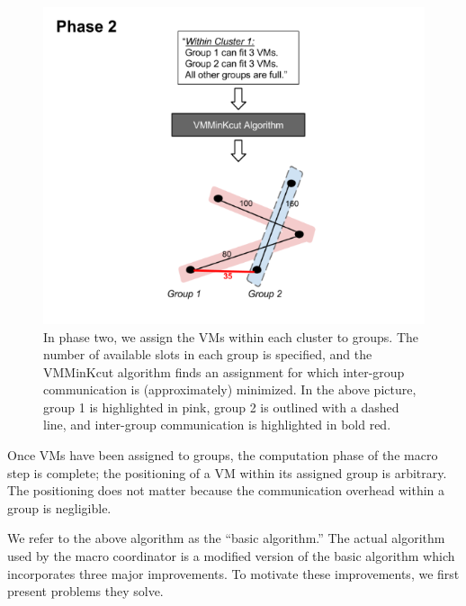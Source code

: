 \documentclass[11pt]{article}
\begin{document}
\begin{figure}
  \centering
\includegraphics[scale=0.7]{phase2.png}

 \caption{In phase two, we assign the VMs within each cluster to groups.  The number of available slots in each group is specified, and the VMMinKcut algorithm finds an assignment for which inter-group communication is (approximately) minimized.  In the above picture, group 1 is highlighted in pink, group 2 is outlined with a dashed line, and inter-group communication is highlighted in bold red.}
 
 \label{fig:macro-basic-2}

\end{figure}

Once VMs have been assigned to groups, the computation phase of the macro step is complete; the positioning of a VM within its assigned group is arbitrary.  The positioning does not matter because the communication overhead within a group is negligible.

We refer to the above algorithm as the ``basic algorithm.''  The actual algorithm used by the macro coordinator is a modified version of the basic algorithm which incorporates three major improvements.  To motivate these improvements, we first present problems they solve.
\end{document}
